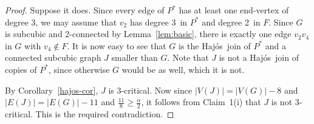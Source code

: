 \documentclass[12pt]{article}
\theoremstyle{plain}
\theoremstyle{definition}
\theoremstyle{remark}
\def\hajos{Haj\'{o}s}
\begin{document}
\begin{proof}
Suppose it does.  Since every edge of $P^*$ has at least one end-vertex of
degree 3, we may assume that $v_2$ has degree 3\ in $P^*$ and degree 2\ in $F$.
Since $G$ is subcubic and 2-connected by Lemma~\ref{lem:basic}, there is exactly one
edge $v_2v_4$ in $G$ with $v_4\notin F$.  It is now easy to see that $G$ is the
\hajos\ join of $P^*$ and a connected subcubic graph $J$ smaller than $G$.  Note
that $J$ is not a \hajos\ join of copies of $P^*$, since otherwise $G$ would be as
well, which it is not.

By Corollary~\ref{hajos-cor}, $J$ is 3-critical.  Now since $|V(J)|=|V(G)|-8$ and
$|E(J)|=|E(G)|-11$ and $\frac{11}8\ge \frac{\alpha}2$, it follows from
Claim~1(i) that $J$ is not 3-critical. This is the required contradiction.
\end{proof}
\end{document}

